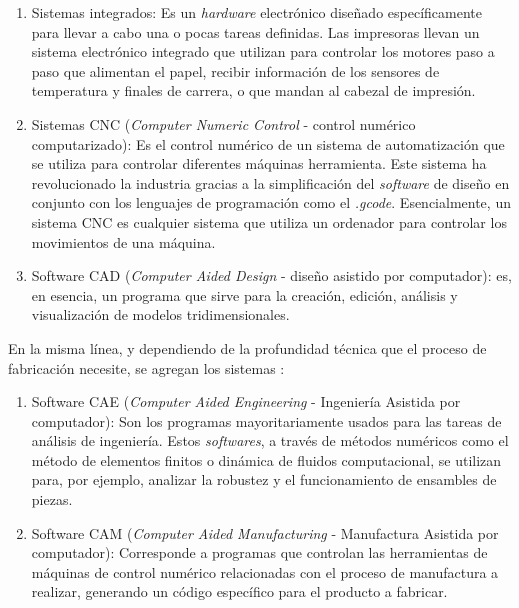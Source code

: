  \begin{enumerate}
 	
	\item Sistemas integrados: Es un \textit{hardware} electrónico diseñado específicamente para llevar a cabo una o pocas tareas definidas. Las impresoras llevan un sistema electrónico integrado que utilizan para controlar los motores paso a paso que alimentan el papel, recibir información de los sensores de temperatura y finales de carrera, o que mandan al cabezal de impresión.
	\item Sistemas CNC (\textit{Computer Numeric Control} - control numérico computarizado): Es el control numérico de un sistema de automatización que se utiliza para controlar diferentes máquinas herramienta. Este sistema ha revolucionado la industria gracias a la simplificación del \textit{software} de diseño en conjunto con los lenguajes de programación como el \textit{.gcode}. Esencialmente, un sistema CNC es cualquier sistema que utiliza un ordenador para controlar los movimientos de una máquina.
	\item Software CAD (\textit{Computer Aided Design} - diseño asistido por computador): es, en esencia, un programa que sirve para la creación, edición, análisis y visualización de modelos tridimensionales.  
	

  \end{enumerate}

En la misma línea, y dependiendo de la profundidad técnica que el proceso de fabricación necesite, se agregan los sistemas \parencite{leao2017}:

\begin{enumerate}
	\item Software CAE (\textit{Computer Aided Engineering} - Ingeniería Asistida por computador): Son los programas mayoritariamente usados para las tareas de análisis de ingeniería. Estos \textit{softwares}, a través de métodos numéricos como el método de elementos finitos o dinámica de fluidos computacional, se utilizan para, por ejemplo, analizar la robustez y el funcionamiento de ensambles de piezas.
	\item Software CAM (\textit{Computer Aided Manufacturing} - Manufactura Asistida por computador): Corresponde a programas que controlan las herramientas de máquinas de control numérico relacionadas con el proceso de manufactura a realizar, generando un código específico para el producto a fabricar. 

\end{enumerate}



